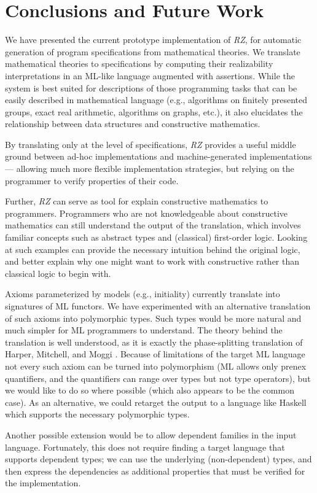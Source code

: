 \section{Conclusions and Future Work}
\label{sec:conclusion}

We have presented the current prototype implementation of 
\emph{RZ}, for automatic generation of
program specifications from mathematical theories. We translate
mathematical theories to specifications by computing their
realizability interpretations in an ML-like language augmented with
assertions. While the system is best suited for descriptions of those
programming tasks that can be easily described in mathematical
language (e.g., algorithms on finitely presented groups, exact real
arithmetic, algorithms on graphs, etc.), it also elucidates the
relationship between data structures and constructive mathematics.

By translating only at the level of specifications, \emph{RZ} provides a
useful middle ground between ad-hoc implementations and
machine-generated implementations --- allowing much more flexible
implementation strategies, but relying on the programmer to
verify properties of their code.

Further, \emph{RZ} can serve as tool for explain constructive
mathematics to programmers.  Programmers who are not knowledgeable
about constructive mathematics can still understand the output of the
translation, which involves familiar concepts such as abstract types
and (classical) first-order logic.   Looking at such examples can
provide the necessary intuition behind the original logic, and better
explain why one might want to work with constructive rather than
classical logic to begin with.

\bigskip
 
Axioms parameterized by models (e.g., initiality) currently translate
into signatures of ML functors.  We have experimented with an
alternative translation of such axioms into polymorphic types.
  Such types would be more natural and much simpler for
ML programmers to understand.  The theory behind the translation is
well understood, as it is exactly the phase-splitting translation of
Harper, Mitchell, and Moggi \cite{harper+:popl90}.  Because of
limitations of the target ML language not every such axiom can be
turned into polymorphism (ML allows only prenex quantifiers, and the
quantifiers can range over types but not type operators), but we would
like to do so where possible (which also appears to be the common
case).  As an alternative, we could retarget the output to a language
like Haskell~\cite{haskell} which supports the necessary polymorphic types.

Another possible extension would be to allow dependent families in the
input language. Fortunately, this does not require finding a target
language that supports dependent types; we can use the underlying
(non-dependent) types, and then express the dependencies as additional
properties that must be verified for the implementation.


